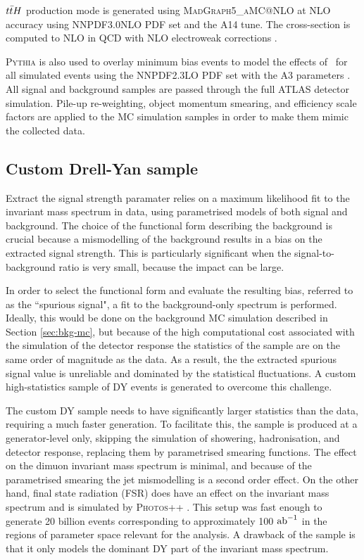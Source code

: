$t\bar{t} H$ production mode is generated using \textsc{MadGraph5\_aMC@NLO}
\cite{Alwall:2014hca, Artoisenet:2012st} at NLO accuracy using
NNPDF3.0NLO PDF set and the A14 tune. The cross-section is
computed to NLO in QCD with NLO electroweak corrections
\cite{Yu:2014cka, Beenakker:2002nc}.

\textsc{Pythia} is also used to
overlay minimum bias events to model the effects of \pileup~for all
simulated events using the NNPDF2.3LO PDF set \cite{Ball:2012cx}
with the A3 parameters \cite{ATL-PHYS-PUB-2016-017}. All signal
and background samples are passed through the full ATLAS
detector simulation. Pile-up re-weighting, object momentum
smearing, and efficiency scale factors are applied to the MC
simulation samples in order to make them mimic the collected data.

\subsection{Custom Drell-Yan sample}

Extract the signal strength paramater relies on a
maximum likelihood fit to the invariant mass spectrum in data,
using parametrised models of both signal and background. The choice
of the functional form describing the background is crucial because
a mismodelling of the background results in a bias on the extracted
signal strength. This is particularly significant when the
signal-to-background ratio is very small, because the impact can be
large.

In order to select the functional form and evaluate the resulting
bias, referred to as the ``spurious signal", a fit to the
background-only spectrum is performed. Ideally, this would be done
on the background MC simulation described in Section \ref{sec:bkg-mc},
but because of the high computational cost associated with the 
simulation of the detector response the statistics of the sample
are on the same order of magnitude as the data. As a result, the
the extracted spurious signal value is unreliable and dominated by
the statistical fluctuations. A custom high-statistics sample of DY
events is generated to overcome this challenge.

The custom DY sample needs to have significantly larger statistics
than the data, requiring a much faster generation. To facilitate
this, the sample is produced at a generator-level only, skipping
the simulation of showering, hadronisation, and detector response,
replacing them by parametrised smearing functions. The effect on
the dimuon invariant mass spectrum is minimal, and because of the
parametrised smearing the jet mismodelling is a second order effect.
On the other hand, final state radiation (FSR) does have an effect on
the invariant mass spectrum and is simulated by \textsc{Photos++}
\cite{Golonka:2006tw}. This setup was fast enough to generate 20
billion events corresponding to approximately 100 $\text{ab}^{-1}$ in the 
regions of parameter space relevant for the analysis. A drawback of
the sample is that it only models the dominant DY part of the
invariant mass spectrum.

